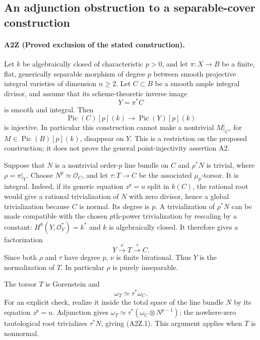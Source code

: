 \subsection{An adjunction obstruction to a separable-cover construction}
\paragraph{A2Z (Proved exclusion of the stated construction).}
Let $k$ be algebraically closed of characteristic $p>0$, and let
$\pi:X\to B$ be a finite, flat, generically separable morphism of
degree $p$ between smooth projective integral varieties of dimension
$n\geq2$. Let $C\subset B$ be a smooth ample integral divisor, and
assume that its scheme-theoretic inverse image
\[
 Y=\pi^*C
\]
is smooth and integral. Then
\[
 \operatorname{Pic}(C)[p](k)\longrightarrow
 \operatorname{Pic}(Y)[p](k)
\]
is injective. In particular this construction cannot make a
nontrivial $M|_C$, for $M\in\operatorname{Pic}(B)[p](k)$, disappear
on $Y$. This is a restriction on the proposed construction; it does
not prove the general point-injectivity assertion A2.

Suppose that $N$ is a nontrivial order-$p$ line bundle on $C$ and
$\rho^*N$ is trivial, where $\rho=\pi|_Y$. Choose $N^p\simeq
\mathcal O_C$, and let $\tau:T\to C$ be the associated
$\mu_p$-torsor. It is integral. Indeed, if its generic equation
$z^p=u$ split in $k(C)$, the rational root would give a rational
trivialization of $N$ with zero divisor, hence a global
trivialization because $C$ is normal. Its degree is $p$.
A trivialization of $\rho^*N$ can be made compatible with the
chosen $p$th-power trivialization by rescaling by a constant:
$H^0(Y,\mathcal O_Y^*)=k^*$ and $k$ is algebraically closed.
It therefore gives a factorization
\[
 Y\xrightarrow{\nu}T\xrightarrow{\tau}C.
\]
Since both $\rho$ and $\tau$ have degree $p$, $\nu$ is finite
birational. Thus $Y$ is the normalization of $T$. In particular
$\rho$ is purely inseparable.

The torsor $T$ is Gorenstein and
\[
 \omega_T\simeq\tau^*\omega_C.                         \tag{A2Z.1}
\]
For an explicit check, realize it inside the total space of the
line bundle $N$ by its equation $z^p=u$. Adjunction gives
$\omega_T\simeq\tau^*(\omega_C\otimes N^{p-1})$; the
nowhere-zero tautological root trivializes $\tau^*N$, giving
(A2Z.1). This argument applies when $T$ is nonnormal.


